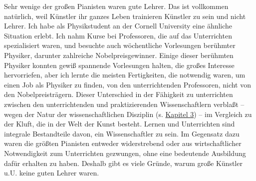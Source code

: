 Sehr wenige der großen Pianisten waren gute Lehrer.
Das ist vollkommen natürlich, weil Künstler ihr ganzes Leben trainieren Künstler zu sein und nicht Lehrer.
Ich habe als Physikstudent an der Cornell University eine ähnliche Situation erlebt. Ich nahm Kurse bei Professoren, die auf das Unterrichten spezialisiert waren, und besuchte auch wöchentliche Vorlesungen berühmter Physiker, darunter zahlreiche Nobelpreisgewinner.
Einige dieser berühmten Physiker konnten gewiß spannende Vorlesungen halten, die großes Interesse hervorriefen, aber ich lernte die meisten Fertigkeiten, die notwendig waren, um einen Job als Physiker zu finden, von den unterrichtenden Professoren, nicht von den Nobelpreisträgern.
Dieser Unterschied in der Fähigkeit zu unterrichten zwischen den unterrichtenden und praktizierenden Wissenschaftlern verblaßt -- wegen der Natur der wissenschaftlichen Disziplin (s. \hyperref[c3_1]{Kapitel 3}) -- im Vergleich zu der Kluft, die in der Welt der Kunst besteht.
Lernen und Unterrichten sind integrale Bestandteile davon, ein Wissenschaftler zu sein.
Im Gegensatz dazu waren die größten Pianisten entweder widerstrebend oder aus wirtschaftlicher Notwendigkeit zum Unterrichten gezwungen, ohne eine bedeutende Ausbildung dafür erhalten zu haben.
Deshalb gibt es viele Gründe, warum große Künstler u.U. keine guten Lehrer waren.


